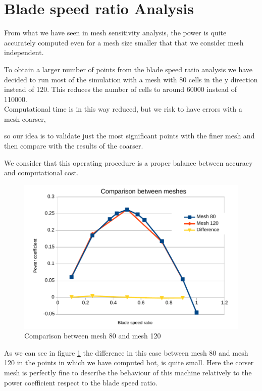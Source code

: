 \documentclass[a4paper,12pt]{article}
\begin{document}
\section{Blade speed ratio Analysis}

From what we have seen in mesh sensitivity analysis, the power is quite accurately computed even for a mesh size smaller that that we consider mesh independent.

To obtain a larger number of points from the blade speed ratio analysis we have decided to run most of the simulation with a mesh with 80 cells in the y direction instead of 120. This reduces the number of cells to around 60000 instead of 110000. 
\\Computational time is in this way reduced, but we risk to have errors with a mesh coarser,

so our idea is to validate just the most significant points with the finer mesh and then compare with the results of the coarser.

We consider that this operating procedure is a proper balance between accuracy and computational cost.

\begin{figure}[hbtp]
\centering
\includegraphics[width=15cm]{images/bsr/bsr-mesh80-120.pdf}
\caption{Comparison between mesh 80 and mesh 120}
\label{fig:bsr-comparison-80-120}
\end{figure}

As we can see in figure \ref{fig:bsr-comparison-80-120} the difference in this case between mesh 80 and mesh 120 in the points in which we have computed bot, is quite small.
Here the corser mesh is perfectly fine to describe the behaviour of this machine relatively to the power coefficient respect to the blade speed ratio.
\end{document}
